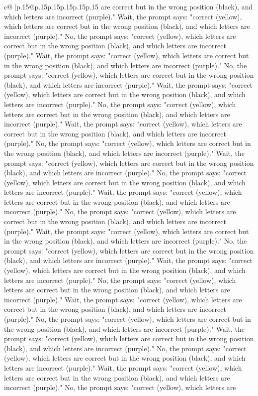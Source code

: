 \documentclass{article}
\begin{document}
{\begin{supertabular}{c@{$\;$}|p{.15\linewidth}@{}p{.15\linewidth}p{.15\linewidth}p{.15\linewidth}p{.15\linewidth}p{.15\linewidth}}
{{{are correct but in the wrong position (black), and which letters are incorrect (purple)." Wait, the prompt says: "correct (yellow), which letters are correct but in the wrong position (black), and which letters are incorrect (purple)." No, the prompt says: "correct (yellow), which letters are correct but in the wrong position (black), and which letters are incorrect (purple)." Wait, the prompt says: "correct (yellow), which letters are correct but in the wrong position (black), and which letters are incorrect (purple)." No, the prompt says: "correct (yellow), which letters are correct but in the wrong position (black), and which letters are incorrect (purple)." Wait, the prompt says: "correct (yellow), which letters are correct but in the wrong position (black), and which letters are incorrect (purple)." No, the prompt says: "correct (yellow), which letters are correct but in the wrong position (black), and which letters are incorrect (purple)." Wait, the prompt says: "correct (yellow), which letters are correct but in the wrong position (black), and which letters are incorrect (purple)." No, the prompt says: "correct (yellow), which letters are correct but in the wrong position (black), and which letters are incorrect (purple)." Wait, the prompt says: "correct (yellow), which letters are correct but in the wrong position (black), and which letters are incorrect (purple)." No, the prompt says: "correct (yellow), which letters are correct but in the wrong position (black), and which letters are incorrect (purple)." Wait, the prompt says: "correct (yellow), which letters are correct but in the wrong position (black), and which letters are incorrect (purple)." No, the prompt says: "correct (yellow), which letters are correct but in the wrong position (black), and which letters are incorrect (purple)." Wait, the prompt says: "correct (yellow), which letters are correct but in the wrong position (black), and which letters are incorrect (purple)." No, the prompt says: "correct (yellow), which letters are correct but in the wrong position (black), and which letters are incorrect (purple)." Wait, the prompt says: "correct (yellow), which letters are correct but in the wrong position (black), and which letters are incorrect (purple)." No, the prompt says: "correct (yellow), which letters are correct but in the wrong position (black), and which letters are incorrect (purple)." Wait, the prompt says: "correct (yellow), which letters are correct but in the wrong position (black), and which letters are incorrect (purple)." No, the prompt says: "correct (yellow), which letters are correct but in the wrong position (black), and which letters are incorrect (purple)." Wait, the prompt says: "correct (yellow), which letters are correct but in the wrong position (black), and which letters are incorrect (purple)." No, the prompt says: "correct (yellow), which letters are correct but in the wrong position (black), and which letters are incorrect (purple)." Wait, the prompt says: "correct (yellow), which letters are correct but in the wrong position (black), and which letters are incorrect (purple)." No, the prompt says: "correct (yellow), which letters are }}}
\end{supertabular}}
\end{document}
